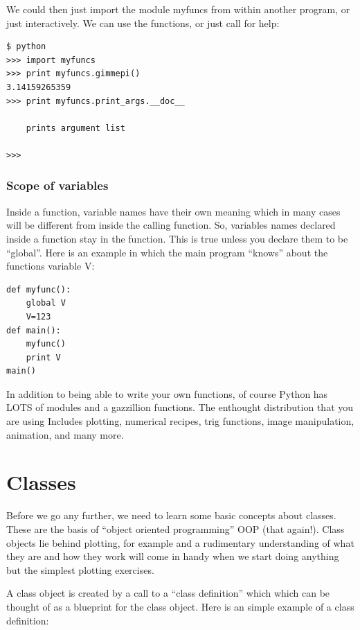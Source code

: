 \documentclass[11pt]{book}
\begin{document}
{{\noindent We could then just import the module {\color{blue}myfuncs} from within another program, or just interactively. We can use the functions, or just call for help:

{ \color{blue} \begin{verbatim}
$ python
>>> import myfuncs
>>> print myfuncs.gimmepi()
3.14159265359
>>> print myfuncs.print_args.__doc__

    prints argument list

>>>
\end{verbatim}}

\subsubsection{Scope of variables}

Inside a function,  variable names have their own meaning  which in many cases will be different from inside the calling function.  So,  variables names declared inside a function stay in the function.  This is true unless you declare them to be ``global''.
Here is an example in which the main program  ``knows'' about the functions variable {\color{blue}V}:

{ \color{blue} \begin{verbatim}
def myfunc():
    global V
    V=123
def main():
    myfunc()
    print V
main()
\end{verbatim}}







In addition to being able to write your own functions, of course
Python has LOTS of modules and a gazzillion functions. The enthought distribution that you are using
Includes plotting, numerical recipes, trig functions, image manipulation, animation,  and many more.



\section{Classes}

Before we go any further, we need to learn some basic concepts about classes. These
 are the basis of  ``object oriented programming'' OOP (that again!).   Class objects lie behind plotting, for example and a rudimentary understanding of what they are and how they work will come in handy when we start doing anything but the simplest plotting exercises.

  A class object is   created by a call  to a ``class definition''  which which can be thought of as a blueprint for the class object.  Here is an simple example of a class definition:

}}
\end{document}
